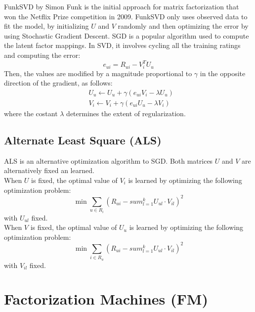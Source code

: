 FunkSVD by Simon Funk is the initial approach for matrix factorization that won the Netflix Prize competition in 2009. FunkSVD only uses observed data to fit the model, by initializing $U$ and $V$ randomly and then optimizing the error by using Stochastic Gradient Descent.
SGD is a popular algorithm \cite{ImprovingSVD, 10.1145/1401890.1401944, 10.1145/1345448.1345466} used to compute the latent factor mappings. In SVD, it involves cycling all the training ratings and computing the error:
\begin{equation*}
e_{ui} = R_{ui} - V_i^T U_u
\end{equation*}
Then, the values are modified by a magnitude proportional to $\gamma$ in the opposite direction of the gradient, as follows:
\begin{equation*}
\begin{split}
& U_u \gets U_u + \gamma (e_{ui} V_i - \lambda U_u) \\
& V_i \gets V_i + \gamma (e_{ui} U_u - \lambda V_i)
\end{split}
\end{equation*}
where the costant $\lambda$ determines the extent of regularization.


\subsection{Alternate Least Square (ALS)}

ALS is an alternative optimization algorithm to SGD. Both matrices $U$ and $V$ are alternatively fixed an learned.\\
When $U$ is fixed, the optimal value of $V_i$ is learned by optimizing the following optimization problem:
\begin{equation*}
\min \sum_{u \in R_i} (R_{ui} - sum_{l = 1}^k U_{ul} \cdot V_{il})^2
\end{equation*}
with $U_{ul}$ fixed.\\
When $V$ is fixed, the optimal value of $U_u$ is learned by optimizing the following optimization problem:
\begin{equation*}
\min \sum_{i \in R_u} (R_{ui} - sum_{l = 1}^k U_{ul} \cdot V_{il})^2
\end{equation*}
with $V_{il}$ fixed.


\section{Factorization Machines (FM)}
\label{sc:factorization-machines}

